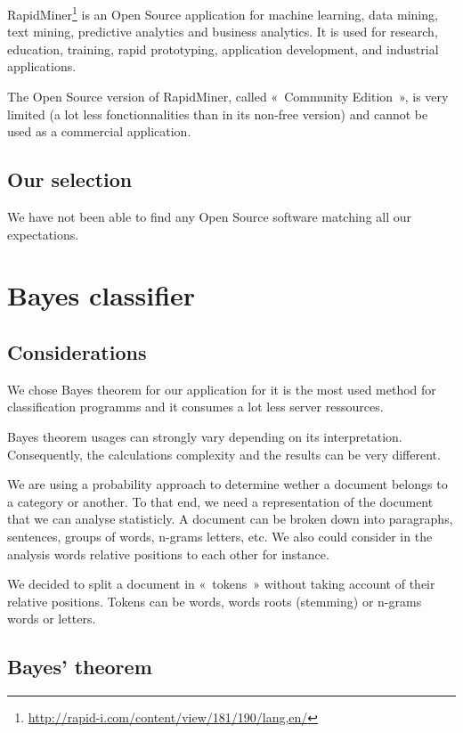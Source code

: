 \documentclass[a4paper,11pt]{article}
\begin{document}
RapidMiner\footnote{\url{http://rapid-i.com/content/view/181/190/lang,en/}} is
an Open Source application for machine learning, data mining, text
mining, predictive analytics and business analytics.
It is used for research, education, training, rapid prototyping, application
development, and industrial applications.

The Open Source version of RapidMiner, called «~Community Edition~», is very
limited (a lot less fonctionnalities than in its non-free version) and cannot
be used as a commercial application.

\subsection{Our selection}

We have not been able to find any Open Source software matching all our
expectations.


\section{Bayes classifier}

\subsection{Considerations}

We chose Bayes theorem for our application for it is the most used method for
classification programms and it consumes a lot less server ressources.

Bayes theorem usages can strongly vary depending on its interpretation.
Consequently, the calculations complexity and the results can be very
different.

We are using a probability approach to determine wether a document belongs to
a category or another. To that end, we need a representation of the document
that we can analyse statisticly. A document can be broken down into
paragraphs, sentences, groups of words, n-grams letters, etc. We also could
consider in the analysis words relative positions to each other for instance.

We decided to split a document in «~tokens~» without taking account of their
relative positions. Tokens can be words, words roots (stemming) or n-grams
words or letters.

\subsection{Bayes' theorem}
\end{document}
